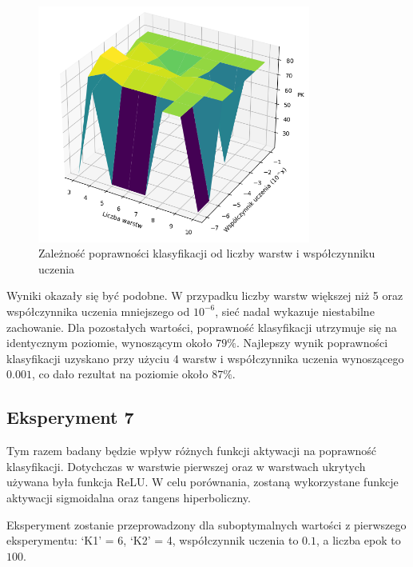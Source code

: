 \documentclass{article}
\begin{document}
\begin{figure}[H]
    \centering
    \includegraphics[width=0.8\textwidth, keepaspectratio]{LR_LAYERS_1500_1000K1K2.PNG}
    \caption{Zależność poprawności klasyfikacji od liczby warstw i współczynniku uczenia}
    \label{fig:lr_layers_3}
\end{figure}

Wyniki okazały się być podobne.
W przypadku liczby warstw większej niż 5 oraz współczynnika uczenia mniejszego od $10^{-6}$, sieć nadal wykazuje niestabilne zachowanie.
Dla pozostałych wartości, poprawność klasyfikacji utrzymuje się na identycznym poziomie, wynoszącym około $79\%$.
Najlepszy wynik poprawności klasyfikacji uzyskano przy użyciu 4 warstw i współczynnika uczenia wynoszącego $0.001$, co dało rezultat na poziomie około $87\%$.

\newpage
\subsection{Eksperyment 7}
Tym razem badany będzie wpływ różnych funkcji aktywacji na poprawność klasyfikacji.
Dotychczas w warstwie pierwszej oraz w warstwach ukrytych używana była funkcja ReLU.
W celu porównania, zostaną wykorzystane funkcje aktywacji sigmoidalna oraz tangens hiperboliczny.

Eksperyment zostanie przeprowadzony dla suboptymalnych wartości z pierwszego eksperymentu: `K1' = 6, `K2' = 4, współczynnik uczenia to $0.1$, a liczba epok to $100$.
\end{document}

